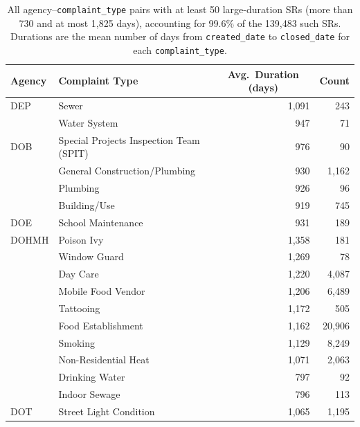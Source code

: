 \documentclass[12pt]{article}
\begin{document}
\begin{table}[t]
\centering
\small
\caption{All agency--\texttt{complaint\_type} pairs with at least 50
large-duration SRs (more than 730 and at most 1,825 days), accounting
for 99.6\% of the 139,483 such SRs. Durations are the mean number of
days from \texttt{created\_date} to \texttt{closed\_date} for each
\texttt{complaint\_type}.}
\label{tab:long-durations}
\begin{tabular}{llrr}
\toprule
Agency & Complaint Type & \multicolumn{1}{c}{Avg.\ Duration (days)} & \multicolumn{1}{c}{Count} \\
\midrule
DEP   & Sewer                                  & 1{,}091 &      243 \\
      & Water System                           &     947 &       71 \\
\midrule
DOB   & Special Projects Inspection Team (SPIT)&     976 &       90 \\
      & General Construction/Plumbing          &     930 &  1{,}162 \\
      & Plumbing                               &     926 &       96 \\
      & Building/Use                           &     919 &      745 \\
\midrule
DOE   & School Maintenance                     &     931 &      189 \\
\midrule
DOHMH & Poison Ivy                             & 1{,}358 &      181 \\
      & Window Guard                           & 1{,}269 &       78 \\
      & Day Care                               & 1{,}220 &  4{,}087 \\
      & Mobile Food Vendor                     & 1{,}206 &  6{,}489 \\
      & Tattooing                              & 1{,}172 &      505 \\
      & Food Establishment                     & 1{,}162 & 20{,}906 \\
      & Smoking                                & 1{,}129 &  8{,}249 \\
      & Non-Residential Heat                   & 1{,}071 &  2{,}063 \\
      & Drinking Water                         &     797 &       92 \\
      & Indoor Sewage                          &     796 &      113 \\
\midrule
DOT   & Street Light Condition                 & 1{,}065 &  1{,}195 \\

\end{tabular}
\end{table}
\end{document}
